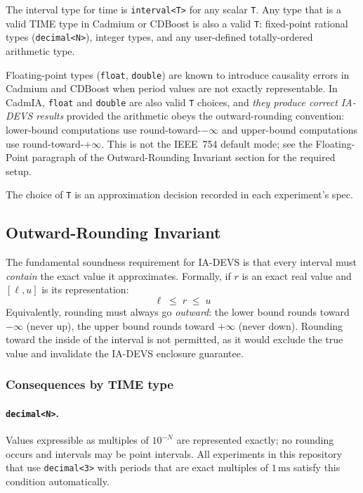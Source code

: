 The interval type for time is \texttt{interval<T>} for any scalar \texttt{T}.
Any type that is a valid TIME type in Cadmium or CDBoost is also a valid
\texttt{T}: fixed-point rational types (\texttt{decimal<N>}), integer types, and
any user-defined totally-ordered arithmetic type.

Floating-point types (\texttt{float}, \texttt{double}) are known to introduce
causality errors in Cadmium and CDBoost when period values are not exactly
representable.  In CadmIA, \texttt{float} and \texttt{double} are also valid
\texttt{T} choices, and \emph{they produce correct IA-DEVS results} provided the
arithmetic obeys the outward-rounding convention: lower-bound computations use
round-toward-$-\infty$ and upper-bound computations use round-toward-$+\infty$.
This is not the IEEE~754 default mode; see the Floating-Point paragraph of the
Outward-Rounding Invariant section for the required setup.

The choice of \texttt{T} is an approximation decision recorded in each
experiment's spec.

\subsection*{Outward-Rounding Invariant}

The fundamental soundness requirement for IA-DEVS is that every interval
must \emph{contain} the exact value it approximates.  Formally, if $r$ is an
exact real value and $[\ell, u]$ is its representation:
\[
  \ell \;\leq\; r \;\leq\; u
\]
Equivalently, rounding must always go \emph{outward}: the lower bound rounds
toward $-\infty$ (never up), the upper bound rounds toward $+\infty$ (never
down).  Rounding toward the inside of the interval is not permitted, as it
would exclude the true value and invalidate the IA-DEVS enclosure guarantee.

\subsubsection*{Consequences by TIME type}

\paragraph{\texttt{decimal<N>}.}
Values expressible as multiples of $10^{-N}$ are represented exactly; no
rounding occurs and intervals may be point intervals.  All experiments in this
repository that use \texttt{decimal<3>} with periods that are exact
multiples of $1\,\text{ms}$ satisfy this condition automatically.

